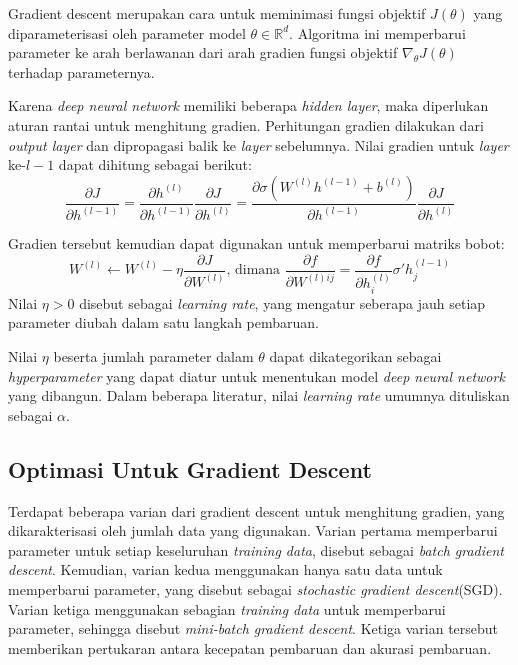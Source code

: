 Gradient descent merupakan cara untuk meminimasi fungsi objektif $J(\theta)$ yang diparameterisasi oleh parameter model $\theta \in \mathbb{R}^d$. Algoritma ini memperbarui parameter ke arah berlawanan dari arah gradien fungsi objektif $\nabla_\theta J(\theta)$ terhadap parameternya.

Karena \emph{deep neural network} memiliki beberapa \emph{hidden layer}, maka diperlukan aturan rantai untuk menghitung gradien. Perhitungan gradien dilakukan dari \emph{output layer} dan dipropagasi balik ke \emph{layer} sebelumnya. Nilai gradien untuk \emph{layer} ke-$l-1$ dapat dihitung sebagai berikut:
\begin{equation}
  \frac{\partial J}{\partial h^{(l-1)}}
  = \frac{\partial h^{(l)}}{\partial h^{(l-1)}}
  \frac{\partial J}{\partial h^{(l)}}
  = \frac{\partial \sigma(W^{(l)} h^{(l-1)} + b^{(l)})}{\partial h^{(l-1)}}
  \frac{\partial J}{\partial h^{(l)}}
\end{equation}

Gradien tersebut kemudian dapat digunakan untuk memperbarui matriks bobot:
\begin{equation}
  W^{(l)} \leftarrow W^{(l)}
  - \eta \frac{\partial J}{\partial W^{(l)}}
  \text{, dimana }
  \frac{\partial f}{\partial W^{(l)ij}}
  = \frac{\partial f}{\partial h_i^{(l)}}\sigma'h_j^{(l-1)}
\end{equation}
Nilai $\eta > 0$ disebut sebagai \emph{learning rate}, yang mengatur seberapa jauh setiap parameter diubah dalam satu langkah pembaruan.

Nilai $\eta$ beserta jumlah parameter dalam $\theta$ dapat dikategorikan sebagai \emph{hyperparameter} yang dapat diatur untuk menentukan model \emph{deep neural network} yang dibangun. Dalam beberapa literatur, nilai \emph{learning rate} umumnya dituliskan sebagai $\alpha$.

\subsection{Optimasi Untuk Gradient Descent}
Terdapat beberapa varian dari gradient descent untuk menghitung gradien, yang dikarakterisasi oleh jumlah data yang digunakan. Varian pertama memperbarui parameter untuk setiap keseluruhan \emph{training data}, disebut sebagai \emph{batch gradient descent}. Kemudian, varian kedua menggunakan hanya satu data untuk memperbarui parameter, yang disebut sebagai \emph{stochastic gradient descent}(SGD). Varian ketiga menggunakan sebagian \emph{training data} untuk memperbarui parameter, sehingga disebut \emph{mini-batch gradient descent}. Ketiga varian tersebut memberikan pertukaran antara kecepatan pembaruan dan akurasi pembaruan.

